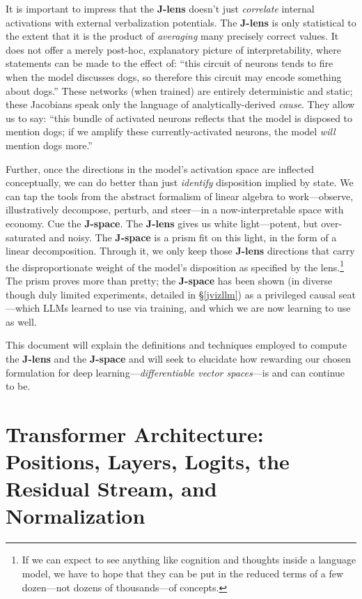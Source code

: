 \documentclass{article}
\begin{document}
It is important to impress that the \textbf{J-lens} doesn't just \textit{correlate} internal activations with external verbalization potentials. The \textbf{J-lens} is only statistical to the extent that it is the product of \textit{averaging} many precisely correct values. It does not offer a merely post-hoc, explanatory picture of interpretability, where statements can be made to the effect of: ``this circuit of neurons tends to fire when the model discusses dogs, so therefore this circuit may encode something about dogs.'' These networks (when trained) are entirely deterministic and static; these Jacobians speak only the language of analytically-derived \textit{cause}. They allow us to say: ``this bundle of activated neurons reflects that the model is disposed to mention dogs; if we amplify these currently-activated neurons, the model \textit{will} mention dogs more.''

Further, once the directions in the model's activation space are inflected conceptually, we can do better than just \textit{identify} disposition implied by state. We can tap the tools from the abstract formalism of linear algebra to work---observe, illustratively decompose, perturb, and steer---in a now-interpretable space with economy. Cue the \textbf{J-space}. The \textbf{J-lens} gives us white light---potent, but over-saturated and noisy. The \textbf{J-space} is a prism fit on this light, in the form of a linear decomposition. Through it, we only keep those \textbf{J-lens} directions that carry the disproportionate weight of the model's disposition as specified by the lens.\footnote{If we can expect to see anything like cognition and thoughts inside a language model, we have to hope that they can be put in the reduced terms of a few dozen---not dozens of thousands---of concepts.} The prism proves more than pretty; the \textbf{J-space} has been shown (in diverse though duly limited experiments, detailed in \S\ref{jvizllm}) as a privileged causal seat---which LLMs learned to use via training, and which we are now learning to use as well.


This document will explain the definitions and techniques employed to compute the \textbf{J-lens} and the \textbf{J-space} and will seek to elucidate how rewarding our chosen formulation for deep learning---\textit{differentiable vector spaces}---is and can continue to be. 

\section{Transformer Architecture: Positions, Layers, Logits, the Residual Stream, and Normalization}
\end{document}
